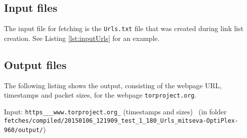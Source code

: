 
\subsection{Input files}

The input file for fetching is the \texttt{Urls.txt} file that was created during link list creation. See Listing \ref{lst:inputUrls} for an example.

\subsection{Output files}

The following listing shows the output, consisting of the webpage \ac{URL}, timestamps and packet sizes, for the webpage \texttt{torproject.org}.
\begin{listing}[h!]
\caption{Input: \texttt{https\_\_\_www.torproject.org\_} (timestamps and sizes) \, (in folder \texttt{fetches/compiled/20150106\_121909\_test\_1\_180\_Urls\_mitseva-OptiPlex-960/output/})}

\label{lst:input1}
\end{listing}

